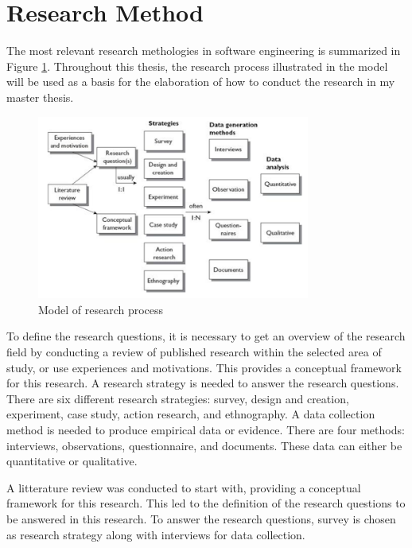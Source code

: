 \section{Research Method}
The most relevant research methologies in software engineering is summarized in Figure \ref{fig:researchProcess}. Throughout this thesis, the research process illustrated in the model will be used as a basis for the elaboration of how to conduct the research in my master thesis. 

\begin{figure}[H]
	\centering
	\includegraphics[width=0.8\textwidth]{images/researchStrategies.png}
	\caption{Model of research process\cite{Oates:2006:RIS:1202299}}
	\label{fig:researchProcess}
\end{figure}

To define the research questions, it is necessary to get an overview of the research field by conducting a review of published research within the selected area of study, or use experiences and motivations. This provides a conceptual framework for this research. A research strategy is needed to answer the research questions. There are six different research strategies: survey, design and creation, experiment, case study, action research, and ethnography. A data collection method is needed to produce empirical data or evidence. There are four methods: interviews, observations, questionnaire, and documents. These data can either be quantitative or qualitative. 

A litterature review was conducted to start with, providing a conceptual framework for this research. This led to the definition of the research questions to be answered in this research. To answer the research questions, survey is chosen as research strategy along with interviews for data collection.


